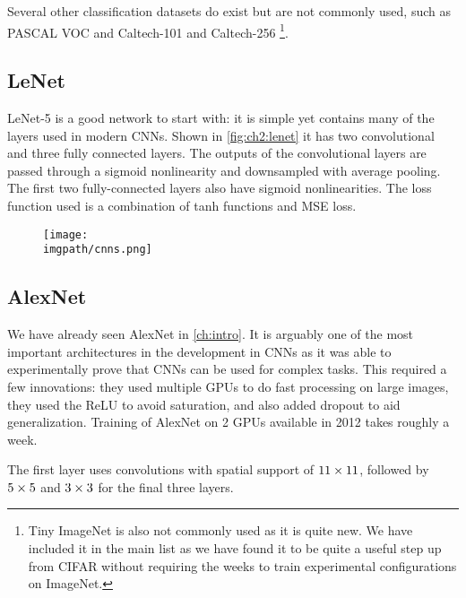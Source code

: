 Several other classification datasets do exist but are not commonly used, such
as PASCAL VOC \cite{Everingham15} and Caltech-101 and Caltech-256
\cite{li_fei-fei_learning_2004}\footnote{Tiny ImageNet is also not commonly
used as it is quite new. We have included it in the main list as we have found it
to be quite a useful step up from CIFAR without requiring the weeks to train
experimental configurations on ImageNet.}.

\subsection{LeNet}
LeNet-5 \cite{lecun_gradient-based_1998} is a good network to start with: it
is simple yet contains many of the layers used in modern CNNs. Shown in
\autoref{fig:ch2:lenet} it has two convolutional and three fully connected
layers. The outputs of the convolutional layers are passed through a sigmoid
nonlinearity and downsampled with average pooling. The first two fully-connected
layers also have sigmoid nonlinearities. The loss function used is a combination
of tanh functions and MSE loss.

\begin{figure}
  \centering
  \texttt{[image: \\imgpath/cnns.png]}
  \label{fig:ch2:lenet}
\end{figure}

\subsection{AlexNet}
We have already seen AlexNet \cite{krizhevsky_imagenet_2012} in \autoref{ch:intro}.
It is arguably one of the most important architectures in the development in CNNs as it
was able to experimentally prove that CNNs can be used for complex tasks. This
required a few innovations: they used multiple GPUs to do fast
processing on large images, they used the ReLU to avoid saturation, and also added dropout
to aid generalization. Training of AlexNet on 2 GPUs available in 2012 takes
roughly a week.

The first layer uses convolutions with spatial support of $11\times11$, followed
by $5\times 5$ and $3\times 3$ for the final three layers.

